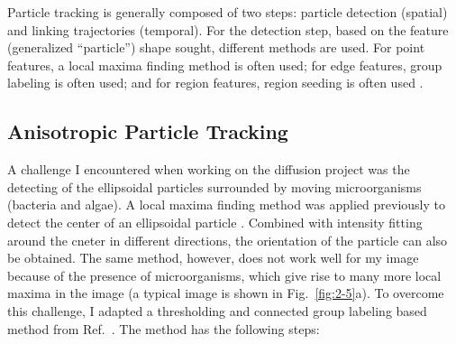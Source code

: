 Particle tracking is generally composed of two steps: particle detection (spatial) and linking trajectories (temporal). For the detection step, based on the feature (generalized ``particle'') shape sought, different methods are used. For point features, a local maxima finding method is often used; for edge features, group labeling is often used; and for region features, region seeding is often used \cite{Dorn2008}.

\subsection{Anisotropic Particle Tracking}

A challenge I encountered when working on the diffusion project was the detecting of the ellipsoidal particles surrounded by moving microorganisms (bacteria and algae). A local maxima finding method was applied previously to detect the center of an ellipsoidal particle \cite{Han2006}. Combined with intensity fitting around the cneter in different directions, the orientation of the particle can also be obtained. The same method, however, does not work well for my image because of the presence of microorganisms, which give rise to many more local maxima in the image (a typical image is shown in Fig.~\ref{fig:2-5}a). To overcome this challenge, I adapted a thresholding and connected group labeling based method from Ref.~\cite{custom-feature-detection, Sauret2015, Cappello2015}. The method has the following steps:

